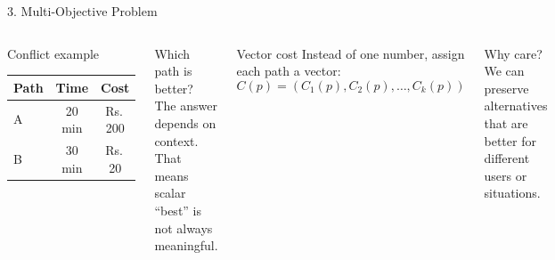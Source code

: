 \documentclass[aspectratio=169]{beamer}
\newcommand{\Rupee}{Rs.\,}
\begin{document}
\begin{frame}{3. Multi-Objective Problem}
    \begin{columns}[T]
        \begin{block}{Conflict example}
            \begin{center}
            \begin{tabular}{lcc}
                \toprule
                Path & Time & Cost\\
                \midrule
                A & 20 min & \Rupee 200\\
                B & 30 min & \Rupee 20\\
                \bottomrule
            \end{tabular}
            \end{center}
        \end{block}

        \begin{alertblock}{Which path is better?}
            The answer depends on context. That means scalar ``best'' is not always meaningful.
        \end{alertblock}

        \begin{block}{Vector cost}
            Instead of one number, assign each path a vector:
            \[
                C(p) = (C_1(p), C_2(p), \ldots, C_k(p))
            \]
        \end{block}

        \begin{block}{Why care?}
            We can preserve alternatives that are better for different users or situations.
        \end{block}
    \end{columns}
\end{frame}
\end{document}
